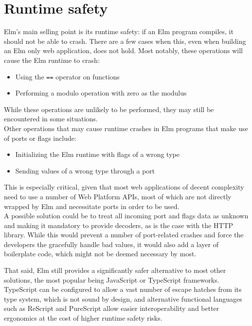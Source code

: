 \section{Runtime safety}
Elm's main selling point is its runtime safety: if an Elm program compiles, it should not be able to crash. There are a few cases when this, even when building an Elm only web application, does not hold. Most notably, these operations will cause the Elm runtime to crash:
\begin{itemize}
    \item Using the \texttt{==} operator on functions \cite{noauthor_corehints5md_nodate}
    \item Performing a modulo operation with zero as the modulus \cite{noauthor_corehints11md_nodate}
\end{itemize}
While these operations are unlikely to be performed, they may still be encountered in some situations.\\

Other operations that may cause runtime crashes in Elm programs that make use of ports or flags include:
\begin{itemize}
    \item Initializing the Elm runtime with flags of a wrong type \cite{noauthor_corehints2md_nodate}
    \item Sending values of a wrong type through a port \cite{noauthor_corehints4md_nodate}
\end{itemize}
This is especially critical, given that most web applications of decent complexity need to use a number of Web Platform APIs, most of which are not directly wrapped by Elm and necessitate ports in order to be used.\\
A possible solution could be to treat all incoming port and flags data as unknown and making it mandatory to provide decoders, as is the case with the HTTP library. While this would prevent a number of port-related crashes and force the developers the gracefully handle bad values, it would also add a layer of boilerplate code, which might not be deemed necessary by most.

That said, Elm still provides a significantly safer alternative to most other solutions, the most popular being JavaScript or TypeScript frameworks. TypeScript can be configured to allow a vast number of escape hatches from its type system, which is not sound by design, and alternative functional languages such as ReScript and PureScript allow easier interoperability and better ergonomics at the cost of higher runtime safety risks.

